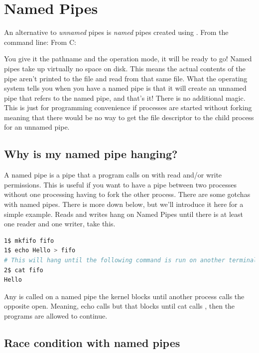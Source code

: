 \section{Named Pipes}

An alternative to \emph{unnamed} pipes is \emph{named} pipes created using .
From the command line:  From C: 

You give it the pathname and the operation mode, it will be ready to go!
Named pipes take up virtually no space on disk.
This means the actual contents of the pipe aren't printed to the file and read from that same file.
What the operating system tells you when you have a named pipe is that it will create an unnamed pipe that refers to the named pipe, and that's it!
There is no additional magic.
This is just for programming convenience if processes are started without forking meaning that there would be no way to get the file descriptor to the child process for an unnamed pipe.

\subsection{Why is my named pipe hanging?}

A named pipe  is a pipe that a program calls  on with read and/or write permissions.
This is useful if you want to have a pipe between two processes without one processing having to fork the other process.
There are some gotchas with named pipes.
There is more down below, but we'll introduce it here for a simple example.
Reads and writes hang on Named Pipes until there is at least one reader and one writer, take this.

\begin{lstlisting}[language=bash]
1$ mkfifo fifo
1$ echo Hello > fifo
# This will hang until the following command is run on another terminal or another process
2$ cat fifo
Hello
\end{lstlisting}

Any  is called on a named pipe the kernel blocks until another process calls the opposite open. Meaning, echo calls  but that blocks until cat calls , then the programs are allowed to continue.

\subsection{Race condition with named pipes}

